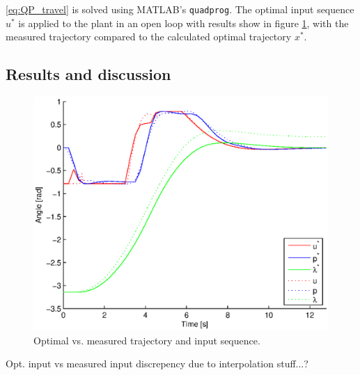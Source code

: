 \eqref{eq:QP_travel} is solved using MATLAB's \texttt{quadprog}. The optimal input sequence $u^*$ is applied to the plant in an open loop with results show in figure \ref{fig:opt_openloop}, with the measured trajectory compared to the calculated optimal trajectory $x^*$.

\subsection{Results and discussion}

\begin{figure}[hp]
	\centering
		\includegraphics[width=1.00\textwidth]{figures/2/opt_vs_meas_traj.eps}
	\caption{Optimal vs. measured trajectory and input sequence.}
	\label{fig:opt_openloop}
\end{figure}

Opt. input vs measured input discrepency due to interpolation stuff...?


